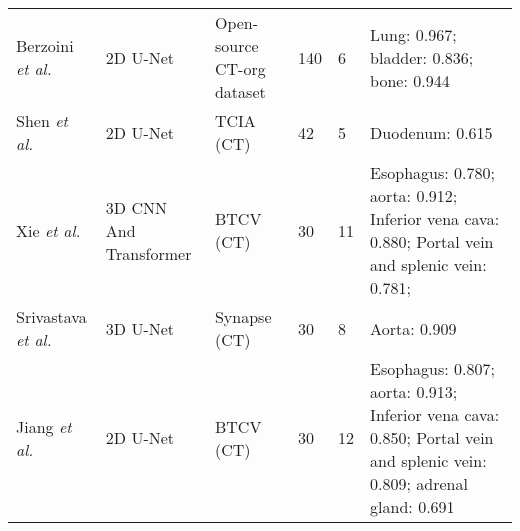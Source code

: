 \documentclass[lettersize,journal]{IEEEtran}
\begin{document}
{\begin{table*}[ht!]
{\begin{tabular}{@{}lllllm{}@{}}
Berzoini {\it{et al.}} \cite{78}    & 2D U-Net                 & Open-source CT-org dataset \cite{79}          & 140                       & 6                           & Lung: 0.967; bladder: 0.836; bone: 0.944                                                                                                                                           \\
Shen {\it{et al.}} \cite{80}        & 2D U-Net                 & TCIA (CT) \cite{56,57}                 & 42                        & 5                           & Duodenum: 0.615                                                                                                                                                                    \\
Xie {\it{et al.}} \cite{82}         & 3D CNN And Transformer   & BTCV (CT) \cite{29}                           & 30                        & 11                          & Esophagus: 0.780; aorta: 0.912; Inferior vena cava: 0.880; Portal vein and splenic vein: 0.781;                                                                                    \\
Srivastava {\it{et al.}} \cite{49}  & 3D U-Net                 & Synapse (CT) \cite{2}                         & 30                        & 8                           & Aorta: 0.909                                                                                                                                                                       \\
Jiang {\it{et al.}} \cite{52}       & 2D U-Net                 & BTCV (CT) \cite{29}                           & 30                        & 12                          & Esophagus: 0.807; aorta: 0.913; Inferior vena cava: 0.850; Portal vein and splenic vein: 0.809; adrenal gland: 0.691                                                               \\ \bottomrule
\end{tabular}%
}
\end{table*}

}
\end{document}
